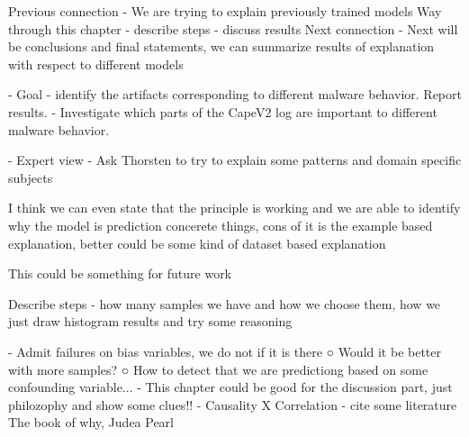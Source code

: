 Previous connection
- We are trying to explain previously trained models
Way through this chapter
- describe steps
- discuss results
Next connection
- Next will be conclusions and final statements, we can summarize results of explanation with respect to different models


- Goal 
- identify the artifacts corresponding to different malware behavior. Report results.
- Investigate which parts of the CapeV2 log are important to different malware behavior. 

- Expert view
  - Ask Thorsten to try to explain some patterns and domain specific subjects 


I think we can even state that the principle is working and we are able to identify why the model is prediction concerete things, cons of it is the example based explanation, better could be some kind of dataset based explanation

This could be something for future work

Describe steps - how many samples we have and how we choose them, how we just draw histogram results and try some reasoning

- Admit failures on bias variables, we do not if it is there
○ Would it be better with more samples?
○ How to detect that we are predictiong based on some confounding variable...
- This chapter could be good for the discussion part, just philozophy and show some clues!!
- Causality X Correlation - cite some literature
The book of why, Judea Pearl
